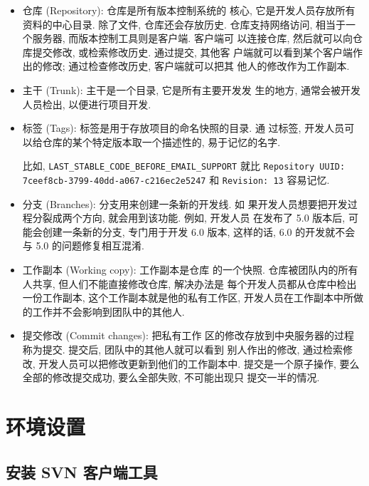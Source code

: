 \documentclass[nofonts, oneside]{ctexart}
\begin{document}
\begin{itemize}
  \item 仓库 (Repository): 仓库是所有版本控制系统的
      核心, 它是开发人员存放所有资料的中心目录. 除了文件, 仓库还会存放历史.
      仓库支持网络访问, 相当于一个服务器, 而版本控制工具则是客户端. 客户端可
      以连接仓库, 然后就可以向仓库提交修改, 或检索修改历史. 通过提交, 其他客
      户端就可以看到某个客户端作出的修改; 通过检查修改历史, 客户端就可以把其
      他人的修改作为工作副本.

  \item 主干 (Trunk): 主干是一个目录, 它是所有主要开发发
      生的地方, 通常会被开发人员检出, 以便进行项目开发.

  \item 标签 (Tags): 标签是用于存放项目的命名快照的目录. 通
      过标签, 开发人员可以给仓库的某个特定版本取一个描述性的, 易于记忆的名字.

      比如, \texttt{LAST\_STABLE\_CODE\_BEFORE\_EMAIL\_SUPPORT} 就比
      \texttt{Repository UUID: 7ceef8cb-3799-40dd-a067-c216ec2e5247} 和
      \texttt{Revision: 13} 容易记忆.

  \item 分支 (Branches): 分支用来创建一条新的开发线. 如
      果开发人员想要把开发过程分裂成两个方向, 就会用到该功能. 例如, 开发人员
      在发布了 5.0 版本后, 可能会创建一条新的分支, 专门用于开发 6.0 版本,
      这样的话, 6.0 的开发就不会与 5.0 的问题修复相互混淆.

  \item 工作副本 (Working copy): 工作副本是仓库
      的一个快照. 仓库被团队内的所有人共享, 但人们不能直接修改仓库, 解决办法是
      每个开发人员都从仓库中检出一份工作副本, 这个工作副本就是他的私有工作区,
      开发人员在工作副本中所做的工作并不会影响到团队中的其他人.

  \item 提交修改 (Commit changes): 把私有工作
      区的修改存放到中央服务器的过程称为提交. 提交后, 团队中的其他人就可以看到
      别人作出的修改, 通过检索修改, 开发人员可以把修改更新到他们的工作副本中.
      提交是一个原子操作, 要么全部的修改提交成功, 要么全部失败, 不可能出现只
      提交一半的情况.
\end{itemize}

\section{环境设置}
\label{sec:environment_setup}

\subsection{安装 SVN 客户端工具}
\label{subsec:svn_installation}
\end{document}
